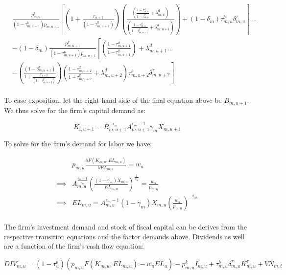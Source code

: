 \documentclass[letterpaper,12pt]{article}
\theoremstyle{definition}
\begin{document}
\begin{spacing}{1.5}
\begin{equation}
\begin{split}
&\frac{p^{k}_{m,u}}{(1-\tau^{b}_{m,u+1})p_{m,u+1}}\left[ \left(1+\frac{r_{u+1}}{(1-\tau^{g}_{m,u+1})}\right) \left( \frac{\left(\frac{1-\tau^{d}_{m,u}}{1-\tau^{g}_{m,u}}+\lambda^{d}_{m,u}\right)}{\left(\frac{1-\tau^{d}_{m,u}}{1-\tau^{g}_{m,u+1}}+\lambda^{d}_{m,u+1}\right)} \right)+ (1-\delta_{m})\tau^{b}_{m,u}\delta^{\tau}_{m,u}\right] ... \\
& -(1-\delta_{m})\frac{p^{k}_{m,u+1}}{(1-\tau^{b}_{m,u+1})p_{m,u+1}}\left[\left(\frac{1-\tau^{d}_{m,u+1}}{1-\tau^{g}_{m,u+1}}\right) + \lambda^{d}_{m,u+1} ... \right. \\
& \left.  -  \left(\frac{(1-\delta^{\tau}_{m,u+1})}{1+\frac{r_{u+2}}{(1-\tau^{g}_{m,u+2})}}\right)  \left(\frac{1-\tau^{d}_{m,u+2}}{1-\tau^{g}_{m,u+2}}+\lambda^{d}_{m,u+2}\right)\tau^{b}_{m,u+2}\delta^{\tau}_{m,u+2} \right]  \\
\end{split}
\end{equation}


To ease exposition, let the right-hand side of the final equation above be $B_{m,u+1}$.  We thus solve for the firm's capital demand as:

\begin{equation}
\label{eqn:cap_demand_tax}
K_{i,u+1} = B_{m,u+1}^{-\epsilon_{m}}A_{m,u+1}^{\epsilon_{m}-1}\gamma_{m}X_{m,u+1}
\end{equation}

To solve for the firm's demand for labor we have:

\begin{equation}
\label{eqn:solve_l_demand_tax}
\begin{split}
   & p_{m,u}\frac{\partial F(K_{m,u},EL_{m,u})}{\partial EL_{m,u}} = w_{u}  \\
 \implies & A_{m,u}^{\frac{\epsilon_{m}-1}{\epsilon_{m}}}\left(\frac{(1-\gamma_{m})X_{m,u}}{EL_{m,u}}\right)^{\frac{1}{\epsilon_{m}}} = \frac{w_{u}}{p_{m,u}} \\
 \implies &  EL_{m,u}  = A_{m,u}^{\epsilon_{m}-1}(1-\gamma_{m})X_{m,u}\left(\frac{w_{u}}{p_{m,u}}\right)^{-\epsilon_{m}} \\ 
\end{split}
\end{equation}

The firm's investment demand and stock of fiscal capital can be derives from the respective transition equations and the factor demands above.  Dividends as well are a function of the firm's cash flow equation:

\begin{equation}
DIV_{m,u} = (1-\tau^{b}_{u})\left(p_{m,u}F(K_{m,u},EL_{m,u})-w_{u}EL_{u}\right) - p^{k}_{m,u}I_{m,u}+\tau^{b}_{m,u}\delta^{\tau}_{m,u}K^{\tau}_{m,u}+VN_{m,t}
\end{equation}


\end{spacing}
\end{document}
